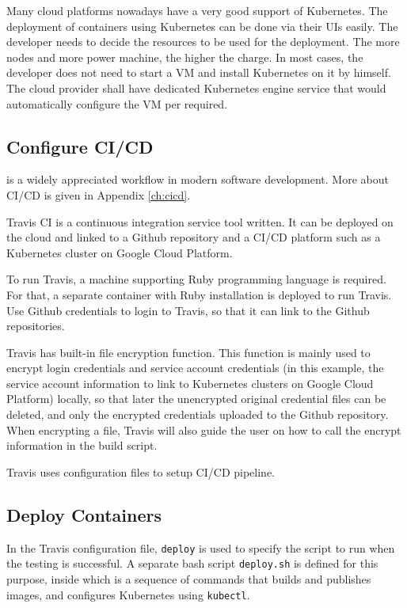 Many cloud platforms nowadays have a very good support of Kubernetes. The deployment of containers using Kubernetes can be done via their UIs easily. The developer needs to decide the resources to be used for the deployment. The more nodes and more power machine, the higher the charge. In most cases, the developer does not need to start a VM and install Kubernetes on it by himself. The cloud provider shall have dedicated Kubernetes engine service that would automatically configure the VM per required.

\subsection{Configure CI/CD}

 is a widely appreciated workflow in modern software development. More about CI/CD is given in Appendix \ref{ch:cicd}.

Travis CI is a continuous integration service tool written. It can be deployed on the cloud and linked to a Github repository and a CI/CD platform such as a Kubernetes cluster on Google Cloud Platform.

To run Travis, a machine supporting Ruby programming language is required. For that, a separate container with Ruby installation is deployed to run Travis. Use Github credentials to login to Travis, so that it can link to the Github repositories.

Travis has built-in file encryption function. This function is mainly used to encrypt login credentials and service account credentials (in this example, the service account information to link to Kubernetes clusters on Google Cloud Platform) locally, so that later the unencrypted original credential files can be deleted, and only the encrypted credentials uploaded to the Github repository. When encrypting a file, Travis will also guide the user on how to call the encrypt information in the build script.

Travis uses configuration files to setup CI/CD pipeline.

\subsection{Deploy Containers}

In the Travis configuration file, \verb|deploy| is used to specify the script to run when the testing is successful. A separate bash script \verb|deploy.sh| is defined for this purpose, inside which is a sequence of commands that builds and publishes images, and configures Kubernetes using \verb|kubectl|.


